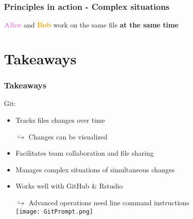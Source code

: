 \documentclass[xcolor=x11names,compress]{beamer}
\renewcommand{\(}{\begin{columns}}
\renewcommand{\)}{\end{columns}}
\newcommand{\<}[1]{\begin{column}{#1}}
\renewcommand{\>}{\end{column}}
\begin{document}
\begin{frame}
\frametitle{Principles in action - Complex situations}
\textcolor{violet}{\textbf{Alice}} and \textcolor{orange}{\textbf{Bob}} work on the same file \textbf{at the same time}
\pause
\begin{itemize}
\item[]
\end{itemize}
\end{frame}


\section{Takeaways}

\begin{frame}
\frametitle{Takeaways}
 Git:
\begin{itemize}[<+->]
    \item Tracks files changes over time
    \item[$\hookrightarrow$] Changes can be visualized
    \item Facilitates team collaboration  and file sharing
    \item Manages complex situations of simultaneous changes
    \item Works well with GitHub \& Rstudio
    \item[$\hookrightarrow$] Advanced operations need line command instructions \\
    \texttt{[image: GitPrompt.png]} \\
    \end{itemize}
\end{frame}
\end{document}
